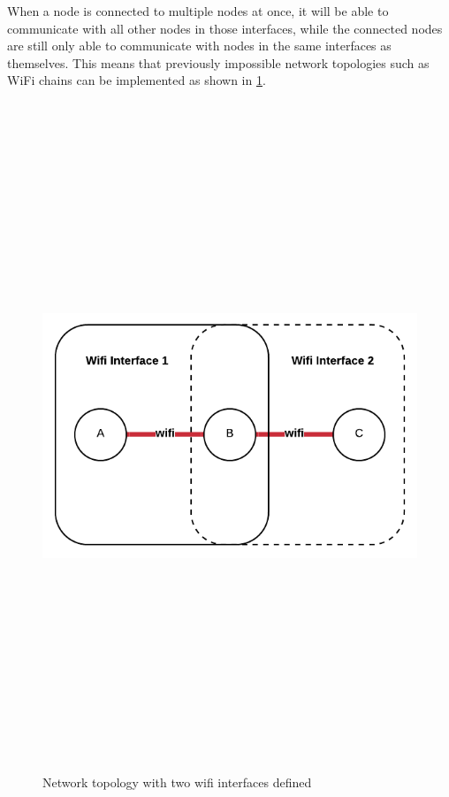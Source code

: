 When a node is connected to multiple nodes at once, it will be able to communicate with all other nodes in those interfaces, while the connected nodes are still only able to communicate with nodes in the same interfaces as themselves.
This means that previously impossible network topologies such as WiFi chains can be implemented as shown in \figurename{ \ref{fig:networkWifi2}}.

\begin{figure}
    \begin{centering}
        \includegraphics[width=14cm,height=20cm,keepaspectratio]{Figures/networkWifiInterface2.png}
        \caption{Network topology with two wifi interfaces defined}
        \label{fig:networkWifi2}
    \end{centering}
\end{figure}


